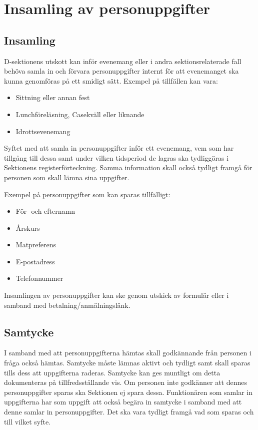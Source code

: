 \documentclass{dsekprotokoll}
\begin{document}
\section{Insamling av personuppgifter}

\subsection{Insamling}
D-sektionens utskott kan inför evenemang eller i andra sektionsrelaterade fall behöva samla in och förvara personuppgifter internt för att evenemanget ska kunna genomföras på ett smidigt sätt. Exempel på tillfällen kan vara:
\begin{itemize}
    \item Sittning eller annan fest
    \item Lunchföreläsning, Casekväll eller liknande
    \item Idrottsevenemang
\end{itemize}

Syftet med att samla in personuppgifter inför ett evenemang, vem som har tillgång till dessa samt under vilken tidsperiod de lagras ska tydliggöras i Sektionens registerförteckning. Samma information skall också tydligt framgå för personen som skall lämna sina uppgifter.

Exempel på personuppgifter som kan sparas tillfälligt:
\begin{itemize}
    \item För- och efternamn
    \item Årskurs
    \item Matpreferens
    \item E-postadress
    \item Telefonnummer
\end{itemize}

Insamlingen av personuppgifter kan ske genom utskick av formulär eller i samband med betalning/anmälningslänk.

\subsection{Samtycke}

I samband med att personuppgifterna hämtas skall godkännande från personen i fråga också hämtas. Samtycke måste lämnas aktivt och tydligt samt skall sparas tills dess att uppgifterna raderas. Samtycke kan ges muntligt om detta dokumenteras på tillfredsställande vis. Om personen inte godkänner att dennes personuppgifter sparas ska Sektionen ej spara dessa. Funktionären som samlar in uppgifterna har som uppgift att också begära in samtycke i samband med att denne samlar in personuppgifter. Det ska vara tydligt framgå vad som sparas och till vilket syfte.
\end{document}
